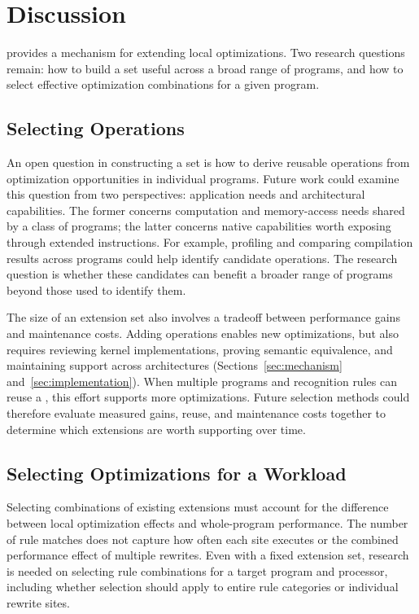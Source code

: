 \section{Discussion}
\label{sec:discussion}

\tool provides a mechanism for extending local optimizations. Two research questions remain: how to build a \kinsn set useful across a broad range of programs, and how to select effective optimization combinations for a given program.

\subsection{Selecting \kinsn Operations}
\label{subsec:selecting-kinsn-operations}

An open question in constructing a \kinsn set is how to derive reusable operations from optimization opportunities in individual programs. Future work could examine this question from two perspectives: application needs and architectural capabilities. The former concerns computation and memory-access needs shared by a class of programs; the latter concerns native capabilities worth exposing through extended instructions. For example, profiling and comparing compilation results across programs could help identify candidate operations. The research question is whether these candidates can benefit a broader range of programs beyond those used to identify them.

The size of an extension set also involves a tradeoff between performance gains and maintenance costs. Adding operations enables new optimizations, but also requires reviewing kernel implementations, proving semantic equivalence, and maintaining support across architectures (Sections~\ref{sec:mechanism} and~\ref{sec:implementation}). When multiple programs and recognition rules can reuse a \kinsn, this effort supports more optimizations. Future selection methods could therefore evaluate measured gains, reuse, and maintenance costs together to determine which extensions are worth supporting over time.

\subsection{Selecting Optimizations for a Workload}
\label{subsec:selecting-workload-optimizations}

Selecting combinations of existing extensions must account for the difference between local optimization effects and whole-program performance. The number of rule matches does not capture how often each site executes or the combined performance effect of multiple rewrites. Even with a fixed extension set, research is needed on selecting rule combinations for a target program and processor, including whether selection should apply to entire rule categories or individual rewrite sites.


